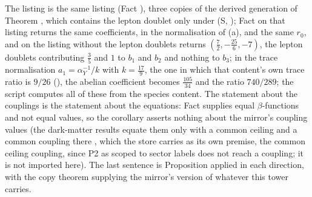 The listing is the same listing (Fact ), three copies of the derived generation of Theorem , which contains the lepton doublet only under (S, ); Fact  on that listing returns the same coefficients, in the normalisation of (a), and the same $r_{0}$, and on the listing without the lepton doublets returns $(\tfrac72, -\tfrac{25}{6}, -7)$, the lepton doublets contributing $\tfrac35$ and $1$ to $b_{1}$ and $b_{2}$ and nothing to $b_{3}$; in the trace normalisation $a_{1} = \alpha_{Y}^{-1}/k$ with $k = \tfrac{17}{9}$, the one in which that content's own trace ratio is $9/26$ (), the abelian coefficient becomes $\tfrac{105}{34}$ and the ratio $740/289$; the script computes all of these from the species content. The statement about the couplings is the statement about the equations: Fact  supplies equal $\beta$-functions and not equal values, so the corollary asserts nothing about the mirror's coupling values (the dark-matter results equate them only with a common ceiling and a common coupling there \cite[Thm.~4.3(iii),(iv)]{ButlerT14}, which the store carries as its own premise, the common ceiling coupling, since P2 as scoped to sector labels does not reach a coupling; it is not imported here). The last sentence is Proposition  applied in each direction, with the copy theorem supplying the mirror's version of whatever this tower carries.
